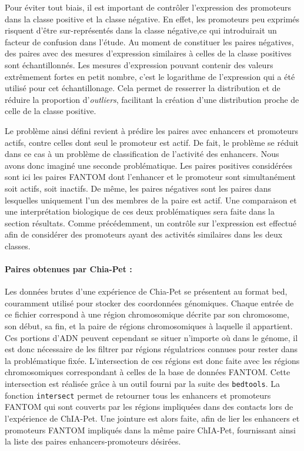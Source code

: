\documentclass[french]{llncs}
\begin{document}
Pour éviter tout biais, il est important de contrôler l'expression des promoteurs dans la classe positive et la classe négative. En effet, les promoteurs peu exprimés risquent d'être sur-représentés dans la classe négative,ce qui introduirait un facteur de confusion dans l'étude. Au moment de constituer les paires négatives, des paires avec des mesures d'expression similaires à celles de la classe positives sont échantillonnés. Les mesures d'expression pouvant contenir des valeurs extrêmement fortes en petit nombre, c'est le logarithme de l'expression qui a été utilisé pour cet échantillonage. Cela permet de resserrer la distribution et de réduire la proportion d'\textit{outliers}, facilitant la création d'une distribution proche de celle de la classe positive.

Le problème ainsi défini revient à prédire les paires avec enhancers et promoteurs actifs, contre celles dont seul le promoteur est actif. De fait, le problème se réduit dans ce cas à un problème de classification de l'activité des enhancers. Nous avons donc imaginé une seconde problématique. Les paires positives considérées sont ici les paires FANTOM dont l'enhancer et le promoteur sont simultanément soit actifs, soit inactifs. De même, les paires négatives sont les paires dans lesquelles uniquement l'un des membres de la paire est actif. Une comparaison et une interprétation biologique de ces deux problématiques sera faite dans la section résultats. Comme précédemment, un contrôle sur l'expression est effectué afin de considérer des promoteurs ayant des activités similaires dans les deux classes.

\paragraph{Paires obtenues par Chia-Pet :}

Les données brutes d'une expérience de Chia-Pet se présentent au format bed, couramment utilisé pour stocker des coordonnées génomiques. Chaque entrée de ce fichier correspond à une région chromosomique décrite par son chromosome, son début, sa fin, et la paire de régions chromosomiques à laquelle il appartient. Ces portions d'ADN peuvent cependant se situer n'importe où dans le génome, il est donc nécessaire de les filtrer par régions régulatrices connues pour rester dans la problématique fixée. L'intersection de ces régions est donc faite avec les régions chromosomiques correspondant à celles de la base de données FANTOM.
Cette intersection est réalisée grâce à un outil fourni par la suite des \texttt{bedtools}. La fonction \texttt{intersect} permet de retourner tous les enhancers et promoteurs FANTOM qui sont couverts par les régions impliquées dans des contacts lors de l'expérience de ChIA-Pet. Une jointure est alors faite, afin de lier les enhancers et promoteurs FANTOM impliqués dans la même paire ChIA-Pet, fournissant ainsi la liste des paires enhancers-promoteurs désirées.
\end{document}
